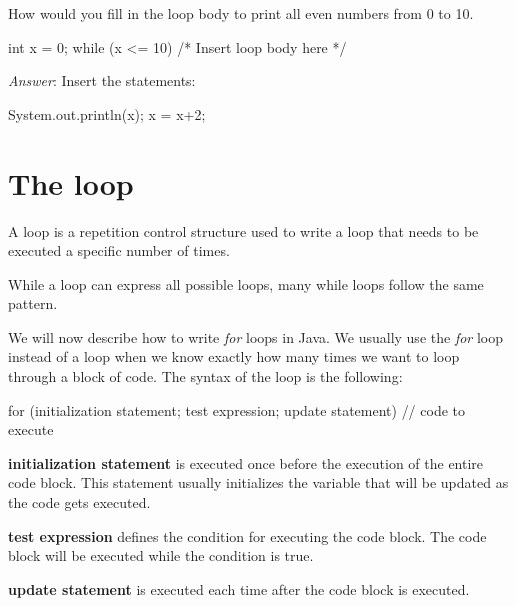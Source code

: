 \begin{example}
How would you fill in the loop body to print all even numbers from 0 to 10.

\begin{code}
int x = 0;
while (x <= 10) {
    /* Insert loop body here */
} 
\end{code}

\emph{Answer}: Insert the statements:
\begin{code}
  System.out.println(x);
  x = x+2;
\end{code}
\end{example}

\section{The  loop}
\begin{definition}
A  loop is a repetition control structure used to write a loop that needs to be executed a specific number of times.
\end{definition}

While a  loop can express all possible loops, many while loops follow the same pattern. 

We will now describe how to write \textit{for} loops in Java. We usually  use the \textit{for} loop instead of a  loop when we know exactly how many times we want to loop through a block of code. The syntax of the loop is the following:

\begin{code}
for (initialization statement; test expression; update statement) {
  // code to execute
 }
\end{code}

\textbf{initialization statement} is executed once before the execution of the entire code block. This statement usually initializes the variable that will be updated as the code gets executed.

\textbf{test expression} defines the condition for executing the code block. The code block will be executed while the condition is true.

\textbf{update statement} is executed each time after the code block is executed.


